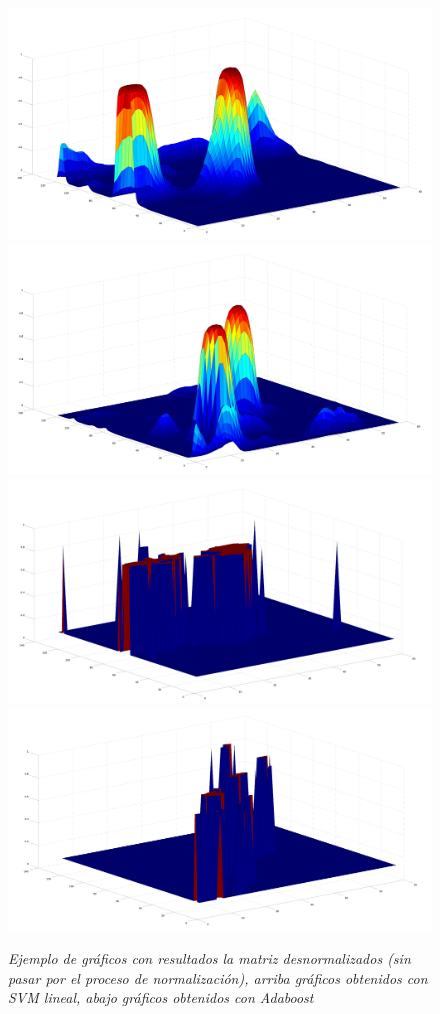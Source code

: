 \begin{figure}[H]
  \centering
  \includegraphics[scale=.1]{images/sig/1}
  \includegraphics[scale=.1]{images/sig/2}
  \includegraphics[scale=.1]{images/sig/3}
  \includegraphics[scale=.1]{images/sig/4}
  \caption{\em Ejemplo de gráficos con resultados la matriz desnormalizados (sin pasar por el proceso de normalización), arriba gráficos obtenidos con SVM lineal, abajo gráficos obtenidos con Adaboost}  
  \label{fig:sigex}
\end{figure}

